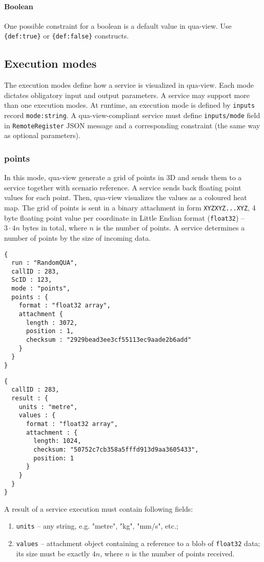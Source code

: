 \paragraph{Boolean}
One possible constraint for a boolean is a default value in qua-view.
Use \texttt{\{def:true\}} or \texttt{\{def:false\}} constructs.


\subsection{Execution modes}

The execution modes define how a service is visualized in qua-view.
Each mode dictates obligatory input and output parameters.
A service may support more than one execution modes.
At runtime, an execution mode is defined by \texttt{inputs} record \texttt{mode:string}.
A qua-view-compliant service must define \texttt{inputs/mode} field in \texttt{RemoteRegister} JSON message
and a corresponding constraint (the same way as optional parameters).

\subsubsection{points}

In this mode, qua-view generate a grid of points in 3D and sends them to a service together with scenario reference.
A service sends back floating point values for each point.
Then, qua-view visualizes the values as a coloured heat map.
The grid of points is sent in a binary attachment in form \texttt{XYZXYZ...XYZ}, 4 byte floating point value per coordinate
in Little Endian format (\texttt{float32}) -- $3 \cdot 4 n$ bytes in total, where $n$ is the number of points.
A service determines a number of points by the size of incoming data.
\begin{lstlisting}[caption={A qua-compliant service run request for mode \texttt{points}}, label={lst:quacompliantinput:points}]
{
  run : "RandomQUA",
  callID : 283,
  ScID : 123,
  mode : "points",
  points : {
    format : "float32 array",
    attachment {
      length : 3072,
      position : 1,
      checksum : "2929bead3ee3cf55113ec9aade2b6add"
    }
  }
}
\end{lstlisting}

\begin{lstlisting}[caption={A qua-compliant service output for mode \texttt{points}}, label={lst:quacompliantresult:points}]
{
  callID : 283,
  result : {
    units : "metre",
    values : {
      format : "float32 array",
      attachment : {
        length: 1024,
        checksum: "50752c7cb358a5fffd913d9aa3605433",
        position: 1
      }
    }
  }
}
\end{lstlisting}
A result of a service execution must contain following fields:
\begin{enumerate}
\item \texttt{units} -- any string, e.g. "metre", "kg", "mm/s", etc.;
\item \texttt{values} -- attachment object containing a reference to a blob of \texttt{float32} data;
 its size must be exactly $4 n$, where $n$ is the number of points received.
\end{enumerate}

